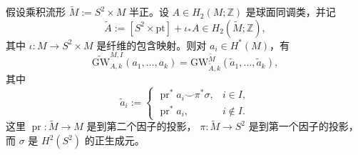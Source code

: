 \begin{proposition}\label{prop:7-3-6}
假设乘积流形 $\widetilde M:=S^2\times M$ 半正。设
$A\in H_2(M;\mathbb Z)$ 是球面同调类，并记
\[
  \widetilde A:=[S^2\times\mathrm{pt}]+\iota_*A
  \in H_2(\widetilde M;\mathbb Z),
\]
其中 $\iota:M\to S^2\times M$ 是纤维的包含映射。则对 $a_i\in H^*(M)$，有
\[
  \widetilde{\mathrm{GW}}^{M,I}_{A,k}(a_1,\ldots,a_k)
  =\mathrm{GW}^{\widetilde M}_{\widetilde A,k}
  (\widetilde a_1,\ldots,\widetilde a_k),
\]
其中
\[
  \widetilde a_i:=
  \begin{cases}
    \operatorname{pr}^*a_i\smile\pi^*\sigma,&i\in I,\\
    \operatorname{pr}^*a_i,&i\notin I.
  \end{cases}
\]
这里 $\operatorname{pr}:\widetilde M\to M$ 是到第二个因子的投影，
$\pi:\widetilde M\to S^2$ 是到第一个因子的投影，而 $\sigma$ 是 $H^2(S^2)$ 的正生成元。
\end{proposition}

